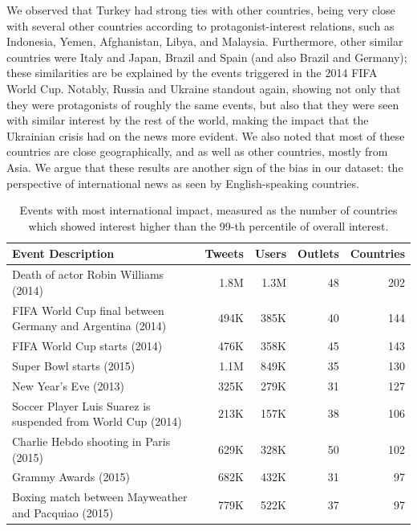 
We observed that Turkey had strong ties with other countries, being very close
with several other countries according to protagonist-interest relations, such
as Indonesia, Yemen, Afghanistan, Libya, and Malaysia. 
%
Furthermore, other similar countries were Italy and Japan, Brazil and Spain (and
also Brazil and Germany); these similarities are be explained by the events
triggered in the 2014 FIFA World Cup.
%
Notably, Russia and Ukraine standout again, showing not only that they were
protagonists of roughly the same events, but also that they were seen with
similar interest by the rest of the world, making the impact that the Ukrainian
crisis had on the news more evident.
%
We also noted that most of these countries are close geographically, and as well
as other countries, mostly from Asia.
%
We argue that these results are another sign of the bias in our dataset: the
perspective of international news as seen by English-speaking countries.

\begin{table}[t]
\centering
{\footnotesize
\begin{tabularx}{\textwidth}{@{}lrrrr@{}}
\toprule
Event Description & Tweets & Users & Outlets & Countries\\
\midrule
Death of actor Robin Williams (2014) & 1.8M & 1.3M & 48 & 202\\
FIFA World Cup final between Germany and Argentina (2014)  & 494K & 385K & 40 & 144\\
FIFA World Cup starts (2014)  & 476K & 358K & 45 &  143\\
Super Bowl starts (2015)  & 1.1M & 849K & 35 & 130\\
New Year's Eve (2013)  & 325K & 279K & 31 & 127\\
Soccer Player Luis Suarez is suspended from World Cup (2014)  & 213K & 157K & 38 & 106\\
Charlie Hebdo shooting in Paris (2015)  & 629K & 328K & 50 & 102\\
Grammy Awards (2015)  & 682K & 432K & 31 & 97\\
Boxing match between Mayweather and Pacquiao (2015)  & 779K & 522K & 37 & 97\\
\bottomrule
\end{tabularx}
}
\caption[Events with most international impact]{Events with most international impact, measured as the number of countries which showed interest higher than the 99-th percentile of overall interest.}\label{tab:impact}
\end{table}


